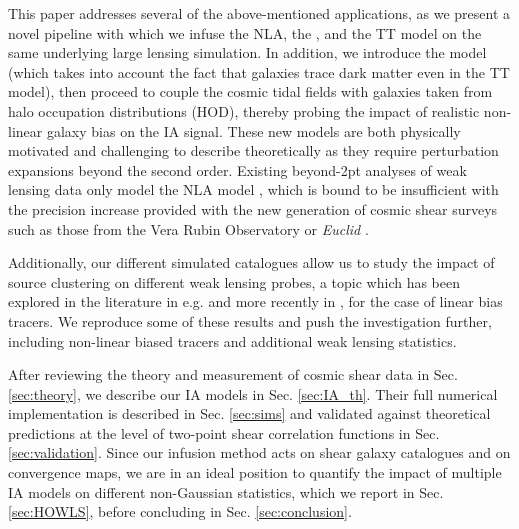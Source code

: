 This paper addresses several of the above-mentioned applications, as we present a novel  pipeline with which we infuse the NLA, the \dNLA, and the TT model on the same underlying large lensing simulation. 
In addition, we introduce the \dTT model (which takes into account the fact that galaxies trace dark matter even in the TT model), then proceed to couple the cosmic tidal fields with galaxies taken from halo occupation distributions (HOD), thereby probing the impact of realistic non-linear galaxy bias on the IA signal. These new models are both physically motivated and challenging to describe theoretically as they require perturbation expansions beyond the second order.  Existing  beyond-2pt analyses of weak lensing data only model the NLA model \citep{DESY3_Zuercher, KiDS1000_JHD}, which is bound to be insufficient with the precision increase provided with the new generation of cosmic shear surveys such as those from the Vera Rubin Observatory \citep{LSST-Design} or {\it Euclid} \citep{RedBook}. 

Additionally, our different simulated catalogues allow us to study the impact of source clustering on different weak lensing probes, a topic which has been explored in the literature in e.g. \citet{source_lens_clustering} and more recently in \citet{DESY3_Gatti_source_clust}, for the case of linear bias tracers. We reproduce some of these results and push the investigation further, including non-linear biased tracers and additional weak lensing statistics. 

After reviewing the theory and measurement of cosmic shear data in Sec. \ref{sec:theory}, we describe our IA models in Sec. \ref{sec:IA_th}.  
Their full numerical implementation is described in Sec. \ref{sec:sims} and validated against theoretical predictions at the level of  two-point shear correlation functions in Sec. \ref{sec:validation}.
Since our infusion method acts on shear galaxy catalogues and on convergence maps, we are in an ideal position to quantify the impact of multiple IA models on different non-Gaussian statistics, which we report in Sec. \ref{sec:HOWLS}, before concluding in Sec. \ref{sec:conclusion}. 